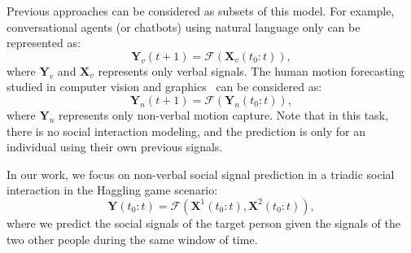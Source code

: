 Previous approaches can be considered as subsets of this model. For example, conversational agents (or chatbots) using natural language only can be represented as:
\begin{equation}
\mathbf{Y}_v (t+1) =  \mathcal{F} \left( \mathbf{X}_v (t_0:t) \right),
\end{equation}
where $\mathbf{Y}_v$ and $\mathbf{X}_v$ represents only verbal signals. The human motion forecasting studied in computer vision and graphics~\cite{Fragkiadaki_2015_ICCV, jain2016structural} can be considered as:
\begin{equation}
\mathbf{Y}_n (t+1) =  \mathcal{F} \left( \mathbf{Y}_n (t_0:t) \right),
\end{equation}
where $\mathbf{Y}_n$ represents only non-verbal motion capture. Note that in this task, there is no social interaction modeling, and the prediction is only for an individual using their own previous signals. 

In our work, we focus on non-verbal social signal prediction in a triadic social interaction in the Haggling game scenario:
\begin{equation}
\mathbf{Y} ( t_0:t ) =  \mathcal{F} \left( \mathbf{X}^1 (t_0:t), \mathbf{X}^2 (t_0:t) \right),
\label{equation:F_ours}
\end{equation}
where we predict the social signals of the target person given the signals of the two other people during the same window of time. %















